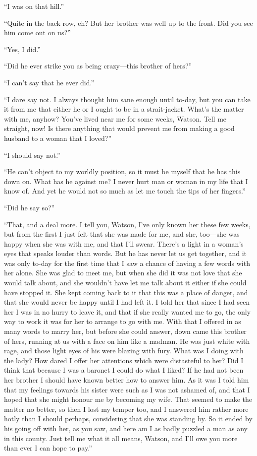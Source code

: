 \documentclass[paper=5.5in:8.5in,BCOR=7mm,twoside,DIV=calc,12pt,usegeometry,openany,chapterprefix,endperiod,headings=big]{scrbook} %
\begin{document}
\enquote{I was on that hill.}

\enquote{Quite in the back row, eh? But her brother was well up to the front. Did you see him come out on us?}

\enquote{Yes, I did.}

\enquote{Did he ever strike you as being crazy---this brother of hers?}

\enquote{I can't say that he ever did.}

\enquote{I dare say not. I always thought him sane enough until to-day, but you can take it from me that either he or I ought to be in a strait-jacket. What's the matter with me, anyhow? You've lived near me for some weeks, Watson. Tell me straight, now! Is there anything that would prevent me from making a good husband to a woman that I loved?}

\enquote{I should say not.}

\enquote{He can't object to my worldly position, so it must be myself that he has this down on. What has he against me? I never hurt man or woman in my life that I know of. And yet he would not so much as let me touch the tips of her fingers.}

\enquote{Did he say so?}

\enquote{That, and a deal more. I tell you, Watson, I've only known her these few weeks, but from the first I just felt that she was made for me, and she, too---she was happy when she was with me, and that I'll swear. There's a light in a woman's eyes that speaks louder than words. But he has never let us get together, and it was only to-day for the first time that I saw a chance of having a few words with her alone. She was glad to meet me, but when she did it was not love that she would talk about, and she wouldn't have let me talk about it either if she could have stopped it. She kept coming back to it that this was a place of danger, and that she would never be happy until I had left it. I told her that since I had seen her I was in no hurry to leave it, and that if she really wanted me to go, the only way to work it was for her to arrange to go with me. With that I offered in as many words to marry her, but before she could answer, down came this brother of hers, running at us with a face on him like a madman. He was just white with rage, and those light eyes of his were blazing with fury. What was I doing with the lady? How dared I offer her attentions which were distasteful to her? Did I think that because I was a baronet I could do what I liked? If he had not been her brother I should have known better how to answer him. As it was I told him that my feelings towards his sister were such as I was not ashamed of, and that I hoped that she might honour me by becoming my wife. That seemed to make the matter no better, so then I lost my temper too, and I answered him rather more hotly than I should perhaps, considering that she was standing by. So it ended by his going off with her, as you saw, and here am I as badly puzzled a man as any in this county. Just tell me what it all means, Watson, and I'll owe you more than ever I can hope to pay.}
\end{document}

